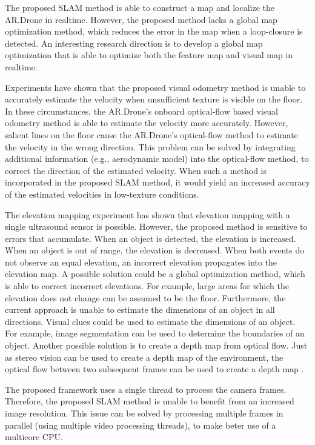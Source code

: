 The proposed SLAM method is able to construct a map and localize the AR.Drone in realtime.
However, the proposed method lacks a global map optimization method, which reduces the error in the map when a loop-closure is detected.
An interesting research direction is to develop a global map optimization that is able to optimize both the feature map and visual map in realtime.

Experiments have shown that the proposed visual odometry method is unable to accurately estimate the velocity when unsufficient texture is visible on the floor.
In these circumstances, the AR.Drone's onboard optical-flow based visual odometry method is able to estimate the velocity more accurately.
However, salient lines on the floor cause the AR.Drone's optical-flow method to estimate the velocity in the wrong direction.
This problem can be solved by integrating additional information (e.g., aerodynamic model) into the optical-flow method, to correct the direction of the estimated velocity.
When such a method is incorporated in the proposed SLAM method, it would yield an increased accuracy of the estimated velocities in low-texture conditions.

The elevation mapping experiment has shown that elevation mapping with a single ultrasound sensor is possible.
However, the proposed method is sensitive to errors that accumulate.
When an object is detected, the elevation is increased.
When an object is out of range, the elevation is decreased.
When both events do not observe an equal elevation, an incorrect elevation propagates into the elevation map.
A possible solution could be a global optimization method, which is able to correct incorrect elevations.
For example, large areas for which the elevation does not change can be assumed to be the floor.
Furthermore, the current approach is unable to estimate the dimensions of an object in all directions.
Visual clues could be used to estimate the dimensions of an object.
For example, image segmentation can be used to determine the boundaries of an object.
Another possible solution is to create a depth map from optical flow.
Just as stereo vision can be used to create a depth map of the environment, the optical flow between two subsequent frames can be used to create a depth map \cite{Jurriaans2011}.

The proposed framework uses a single thread to process the camera frames.
Therefore, the proposed SLAM method is unable to benefit from an increased image resolution.
This issue can be solved by processing multiple frames in parallel (using multiple video processing threads), to make beter use of a multicore CPU.